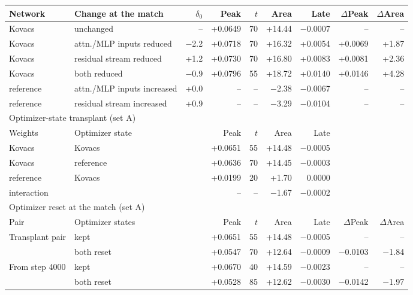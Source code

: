 \begin{tabular}{llrrrrrrr}
\toprule
Network & Change at the match & $\delta_0$ & Peak & $t$ & Area & Late & $\Delta$Peak & $\Delta$Area\\
\midrule
Kovacs & unchanged & -- & +0.0649 & 70 & +14.44 & $-$0.0007 & -- & --\\
Kovacs & attn./MLP inputs reduced & $-$2.2 & +0.0718 & 70 & +16.32 & +0.0054 & +0.0069 & +1.87\\
Kovacs & residual stream reduced & +1.2 & +0.0730 & 70 & +16.80 & +0.0083 & +0.0081 & +2.36\\
Kovacs & both reduced & $-$0.9 & +0.0796 & 55 & +18.72 & +0.0140 & +0.0146 & +4.28\\
reference & attn./MLP inputs increased & +0.0 & -- & -- & $-$2.38 & $-$0.0067 & -- & --\\
reference & residual stream increased & +0.9 & -- & -- & $-$3.29 & $-$0.0104 & -- & --\\
\midrule
\multicolumn{9}{l}{Optimizer-state transplant (set A)}\\
Weights & Optimizer state & & Peak & $t$ & Area & Late & & \\
\midrule
Kovacs & Kovacs & & +0.0651 & 55 & +14.48 & $-$0.0005 & & \\
Kovacs & reference & & +0.0636 & 70 & +14.45 & $-$0.0003 & & \\
reference & Kovacs & & +0.0199 & 20 & +1.70 & 0.0000 & & \\
interaction &  & & -- & -- & $-$1.67 & $-$0.0002 & & \\
\midrule
\multicolumn{9}{l}{Optimizer reset at the match (set A)}\\
Pair & Optimizer states & & Peak & $t$ & Area & Late & $\Delta$Peak & $\Delta$Area\\
\midrule
Transplant pair & kept & & +0.0651 & 55 & +14.48 & $-$0.0005 & -- & --\\
 & both reset & & +0.0547 & 70 & +12.64 & $-$0.0009 & $-$0.0103 & $-$1.84\\
From step 4000 & kept & & +0.0670 & 40 & +14.59 & $-$0.0023 & -- & --\\
 & both reset & & +0.0528 & 85 & +12.62 & $-$0.0030 & $-$0.0142 & $-$1.97\\
\bottomrule
\end{tabular}
